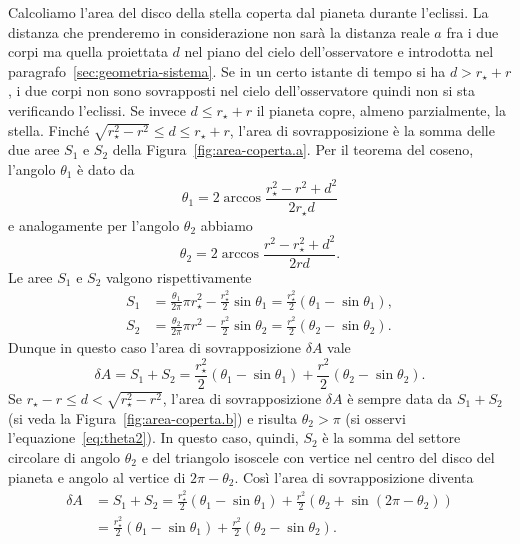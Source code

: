 Calcoliamo l'area del disco della stella coperta dal pianeta durante
l'eclissi. La distanza che prenderemo in considerazione non sarà la distanza
reale $a$ fra i due corpi ma quella proiettata $d$ nel piano del cielo
dell'osservatore e introdotta nel paragrafo~\ref{sec:geometria-sistema}. Se in
un certo istante di tempo si ha $d > r_\star + r$, i due corpi non sono
sovrapposti nel cielo dell'osservatore quindi non si sta verificando
l'eclissi. Se invece $d \leq r_\star + r$ il pianeta copre, almeno parzialmente,
la stella. Finché $\sqrt{r_\star^2 - r^2} \leq d \leq r_\star + r$, l'area di
sovrapposizione è la somma delle due aree $S_1$ e $S_2$ della
Figura~\ref{fig:area-coperta.a}. Per il teorema del coseno, l'angolo $\theta_1$
è dato da
\begin{equation}
  \theta_1 = 2 \arccos \frac{r_\star^2 - r^2 + d^2}{2r_\star d}
\end{equation}
e analogamente per l'angolo $\theta_2$ abbiamo
\begin{equation}
  \label{eq:theta2}
  \theta_2 = 2 \arccos \frac{r^2 - r_\star^2 + d^2}{2rd}.
\end{equation}
Le aree $S_1$ e $S_2$ valgono rispettivamente
\begin{subequations}
  \begin{align}
    S_1 &= \frac{\theta_1}{2\pi}\pi r_\star^2 - \frac{r_\star^2}{2}\sin\theta_1
    = \frac{r_\star^2}{2}(\theta_1 - \sin\theta_1), \\
    S_2 &= \frac{\theta_2}{2\pi}\pi r^2 - \frac{r^2}{2}\sin\theta_2 =
    \frac{r^2}{2}(\theta_2 - \sin\theta_2).
  \end{align}
\end{subequations}
Dunque in questo caso l'area di sovrapposizione $\delta A$ vale
\begin{equation}
  \delta A = S_1 + S_2 = \frac{r_\star^2}{2}(\theta_1 - \sin\theta_1) +
  \frac{r^2}{2}(\theta_2 - \sin\theta_2).
\end{equation}
Se $r_\star - r \leq d < \sqrt{r_\star^2 - r^2}$, l'area di sovrapposizione
$\delta A$ è sempre data da $S_1 + S_2$ (si veda la
Figura~\ref{fig:area-coperta.b}) e risulta $\theta_2 > \pi$ (si osservi
l'equazione~\eqref{eq:theta2}). In questo caso, quindi, $S_2$ è la somma del
settore circolare di angolo $\theta_2$ e del triangolo isoscele con vertice nel
centro del disco del pianeta e angolo al vertice di $2\pi - \theta_2$. Così
l'area di sovrapposizione diventa
\begin{equation}
  \begin{split}
    \delta A &= S_1 + S_2 = \frac{r_\star^2}{2}(\theta_1 - \sin\theta_1) +
    \frac{r^2}{2}(\theta_2 + \sin(2\pi -\theta_2)) \\
    &= \frac{r_\star^2}{2}(\theta_1 - \sin\theta_1) + \frac{r^2}{2}(\theta_2 -
    \sin\theta_2).
  \end{split}
\end{equation}
